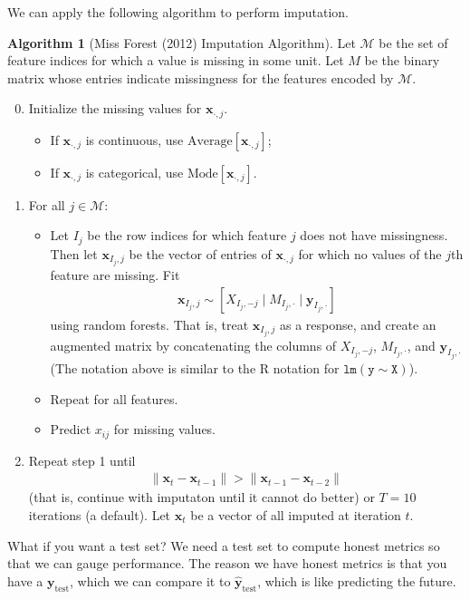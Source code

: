 \documentclass[12pt, a4paper]{article}
\theoremstyle{definition}
\newtheorem{algorithm}{Algorithm}
\begin{document}
	We can apply the following algorithm to perform imputation.
	\begin{tcolorbox}
		\begin{algorithm}[Miss Forest (2012) Imputation Algorithm]
			Let $\mathcal{M}$ be the set of feature indices for which a
			value is missing in some unit. Let $M$ be the binary matrix
			whose entries indicate missingness for the features encoded by
			$\mathcal{M}$.
			\begin{enumerate}[label=\textbf{(\arabic*)}]
				\setcounter{enumi}{-1}
				\item Initialize the missing values for $\bm{x}_{\cdot, j}$.
				\begin{itemize}
					\item If $\bm{x}_{\cdot, j}$ is continuous, use
					$\text{Average}[\bm{x}_{\cdot, j}]$;
					\item If $\bm{x}_{\cdot, j}$ is categorical, use
					$\text{Mode}[\bm{x}_{\cdot, j}]$.
				\end{itemize}
				\item For all $j\in \mathcal{M}$:
				\begin{itemize}
					\item Let $I_j$ be the row indices for which feature $j$
					does not have missingness. Then let $\bm{x}_{I_j, j}$ be
					the vector of entries of $\bm{x}_{\cdot, j}$ for which no
					values of the $j$th feature are missing.
					Fit
					\begin{align*}
						\bm{x}_{I_j, j}\sim [X_{I_j,-j}\mid M_{I_j, \cdot} \mid \bm{y}_{I_j, \cdot}]
					\end{align*}
					using random forests. That is, treat $\bm{x}_{I_j, j}$ as
					a response, and create an augmented matrix by concatenating
					the columns of $X_{I_j,-j}$, $M_{I_j, \cdot}$, and $\bm{y}_{I_j, \cdot}$
					(The notation above is similar to the R notation for
					$\mathtt{lm(y \sim  X)}$).
					\item Repeat for all features.
					\item Predict $x_{ij}$ for missing values.
				\end{itemize}
				\item Repeat step 1 until 
				\begin{align*}
					\|\bm{x}_t - \bm{x}_{t-1}\| > \|\bm{x}_{t-1} - \bm{x}_{t-2}\|
				\end{align*}
				(that is, continue with imputaton until it cannot do better)
				or $T = 10$ iterations (a default). Let $\bm{x}_t$ be a vector of
				all imputed at iteration $t$.
			\end{enumerate}
		\end{algorithm}
	\end{tcolorbox}
	What if you want a test set? We need a test set to compute honest metrics so that
	we can gauge performance. The reason we have honest metrics is that you have a
	$\bm{y}_{\text{test}}$, which we can compare it to $\hat{\bm{y}}_{\text{test}}$,
	which is like predicting the future.
	
\end{document}
